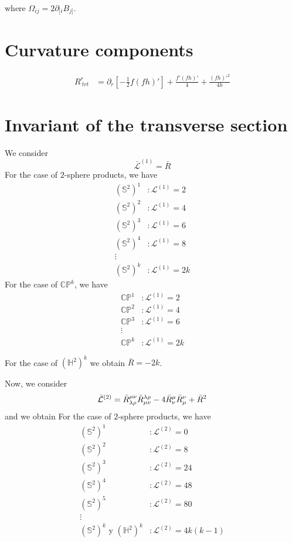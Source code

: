 where $\Omega_{ij}=2\partial_{[i}B_{j]}$.

\section{Curvature components}
\begin{align}
  R^r_{~trt}&=\partial_r\left[-\frac{1}{2}f(fh)'\right]+\frac{f'(fh)'}{4}+\frac{(fh)'^2}{4h}
\end{align}


\section{Invariant of the transverse section}
We consider
\begin{equation}
  \bar{\mathcal{L}}^{(1)}=\bar{R}
\end{equation}
For the case of $2$-sphere products, we have
\begin{align}
  (\mathbb{S}^2)^1&:\mathcal{L}^{(1)}=2\\
  (\mathbb{S}^2)^2&:\mathcal{L}^{(1)}=4\\
  (\mathbb{S}^2)^3&:\mathcal{L}^{(1)}=6\\
  (\mathbb{S}^2)^4&:\mathcal{L}^{(1)}=8\\
  \vdots\\
  (\mathbb{S}^2)^k&:\mathcal{L}^{(1)}=2k
\end{align}
For the case of $\mathbb{CP}^k$, we have
\begin{align}
  \mathbb{CP}^1&:\mathcal{L}^{(1)}=2\\
  \mathbb{CP}^2&:\mathcal{L}^{(1)}=4\\
  \mathbb{CP}^3&:\mathcal{L}^{(1)}=6\\
  \vdots\\
  \mathbb{CP}^k&:\mathcal{L}^{(1)}=2k
\end{align}

For the case of $(\mathbb{H}^2)^k$ we obtain $\bar{R}=-2k$. 

Now, we consider $$\bar{\mathcal{L}}^{(2)}=\bar{R}^{\mu\nu }_{\lambda\rho}\bar{R}_{\mu\nu }^{\lambda\rho }-4\bar{R}^\mu_\nu \bar{R}^\nu_\mu +\bar{R}^2$$ and we obtain 
For the case of $2$-sphere products, we have
\begin{align}
  (\mathbb{S}^2)^1&:\mathcal{L}^{(2)}=0\\
  (\mathbb{S}^2)^2&:\mathcal{L}^{(2)}=8\\
  (\mathbb{S}^2)^3&:\mathcal{L}^{(2)}=24\\
  (\mathbb{S}^2)^4&:\mathcal{L}^{(2)}=48\\
  (\mathbb{S}^2)^5&:\mathcal{L}^{(2)}=80\\
  \vdots\\
  (\mathbb{S}^2)^k \text{ y } (\mathbb{H}^2)^k&:\mathcal{L}^{(2)}=4k(k-1)
\end{align}

